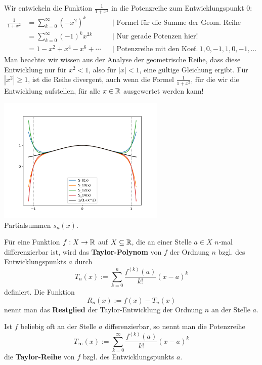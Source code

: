 \begin{bsp} Wir entwickeln die Funktion $\frac{1}{1+x^2}$ in die Potenzreihe zum Entwicklungspunkt $0$: 
	\begin{align*}
		\frac{1}{1+x^2} & = \sum_{k=0}^\infty (-x^2)^k & &|\text{ Formel für die Summe der Geom. Reihe}
		\\ & = \sum_{k=0}^\infty (-1)^k x^{2k} & &|\text{ Nur gerade Potenzen hier!} 
		\\ & = 1 - x^2 + x^4 - x^6 + \cdots & &| \text{ Potenzreihe mit den Koef.} \ 1, 0,-1,1,0,-1,\ldots 
	\end{align*}
	Man beachte: wir wissen aus der Analyse der geometrische Reihe, dass diese Entwicklung nur  für $x^2  < 1$, also für $|x| <1$, eine gültige Gleichung ergibt. Für $|x^2| \ge 1$, ist die Reihe divergent, auch wenn die Formel $\frac{1}{1+x^2}$, für die wir die Entwicklung aufstellen, für alle $x \in \mathbb{R}$ ausgewertet werden kann! 
	
	\begin{center}
	\includegraphics[width=0.6\textwidth]{pics/eins_durch_quadrat_plus_eins.pdf}
	\\ Partialsummen $s_n(x)$.
\end{center}

\end{bsp} 


\begin{defn} 
	Für eine Funktion $f : X \to \mathbb{R}$ auf $X \subseteq \mathbb{R}$, die an einer Stelle $a \in X$ $n$-mal differenzierbar ist, wird das \textbf{Taylor-Polynom} von $f$ der Ordnung $n$ bzgl. des Entwicklungspunkts $a$ durch 
	\[
		T_n(x) := \sum_{k=0}^n \frac{f^{(k)}(a)}{k!} (x-a)^k
	\]
	definiert. Die Funktion 
	\[
		R_n(x) := f(x) - T_n(x)
	\] nennt man das \textbf{Restglied} der Taylor-Entwicklung der Ordnung $n$ an der Stelle $a$. 
	
	Ist $f$ beliebig oft an der Stelle $a$ differenzierbar, so nennt man die Potenzreihe 
	\[
		T_\infty(x) := \sum_{k=0}^\infty \frac{f^{(k)}(a)}{k!} (x-a)^k
	\]
	die \textbf{Taylor-Reihe} von $f$ bzgl. des Entwicklungspunkts $a$. 
\end{defn} 

